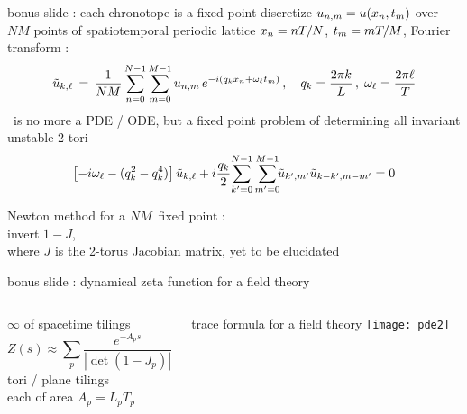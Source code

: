 %

\begin{frame}{bonus slide : each chronotope is a fixed point}
discretize $u_{n,m} = u(x_n,t_m)$ over
$N M$ points of spatiotemporal periodic lattice $x_n = n {T_{}}/N$,
 $t_m = m {T_{}}/M$, Fourier transform :
%
\[
\tilde{u}_{k,\ell} \,=\,
  \frac{1}{NM} \sum^{N-1}_{n=0} \sum^{M-1}_{m=0}
  u_{n,m} \, e^{-i(q_kx_n + \omega_\ell t_m)}
    \,,\quad
q_k = \frac{2 \pi k}{L}
    \,,\;
\omega_\ell = \frac{2 \pi \ell}{{T_{}}}
\]
\KS\ is no more a PDE / ODE, but a fixed point problem of
determining all invariant unstable 2-tori
\[
\left[- i \omega_\ell - ( q_k^2 - q_k^4 ) \right]\tilde{u}_{k,\ell}
+ i \frac{q_k}{2} \!\sum_{k'=0}^{N-1} \sum^{M-1}_{m'=0}\!\!
\tilde{u}_{k',m'} \tilde{u}_{k-k',m-m'}
    =
0
\]

\bigskip

Newton method for a $NM$\dmn\ fixed point :
\\ invert $1-J$,
\\ where $J$ is the
2-torus Jacobian matrix, yet to be elucidated
\end{frame}

\begin{frame}{bonus slide : dynamical zeta function for a field theory}
  \begin{columns}
\begin{block}{$\infty$ of spacetime tilings}
\[
Z(s) \approx
\sum_{p} \frac{e^{-A_p s}}
              {\left|\det(1-J_p)\right|}
\]
tori / plane tilings
\\
each of area $A_p = L_p T_p$
\end{block}
\begin{block}{trace formula  for a field theory}
\texttt{[image: pde2]}%
\end{block}
  \end{columns}
\end{frame}

